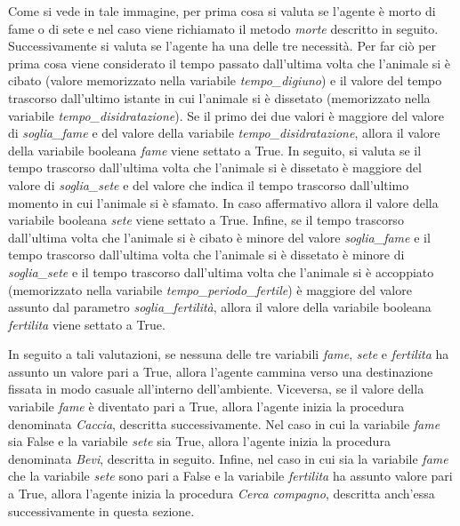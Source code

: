 \documentclass[11pt]{article}
\begin{document}
Come si vede in tale immagine, per prima cosa si valuta se l'agente è morto di fame o di sete e nel caso viene richiamato il metodo \emph{morte} descritto in seguito. Successivamente si valuta se l'agente ha una delle tre necessità. Per far ciò per prima cosa viene considerato il tempo passato dall'ultima volta che l'animale si è cibato (valore memorizzato nella variabile \emph{tempo\_digiuno}) e il valore del tempo trascorso dall'ultimo istante in cui l'animale si è dissetato (memorizzato nella variabile \emph{tempo\_disidratazione}). Se il primo dei due valori è maggiore del valore di \emph{soglia\_fame} e del valore della variabile \emph{tempo\_disidratazione}, allora il valore della variabile booleana \emph{fame} viene settato a True. In seguito, si valuta se il tempo trascorso dall'ultima volta che l'animale si è dissetato è maggiore del valore di \emph{soglia\_sete} e del valore che indica il tempo trascorso dall'ultimo momento in cui l'animale si è sfamato. In caso affermativo allora il valore della variabile booleana \emph{sete} viene settato a True. Infine, se il tempo trascorso dall'ultima volta che l'animale si è cibato è minore del valore \emph{soglia\_fame} e il tempo trascorso dall'ultima volta che l'animale si è dissetato è minore di \emph{soglia\_sete} e il tempo trascorso dall'ultima volta che l'animale si è accoppiato (memorizzato nella variabile \emph{tempo\_periodo\_fertile}) è maggiore del valore assunto dal parametro \emph{soglia\_fertilità}, allora il valore della variabile booleana \emph{fertilita} viene settato a True. 

In seguito a tali valutazioni, se nessuna delle tre variabili \emph{fame}, \emph{sete} e \emph{fertilita} ha assunto un valore pari a True, allora l'agente cammina verso una destinazione fissata in modo casuale all'interno dell'ambiente. Viceversa, se il valore della variabile \emph{fame} è diventato pari a True, allora l'agente inizia la procedura denominata \emph{Caccia}, descritta successivamente. Nel caso in cui la variabile \emph{fame} sia False e la variabile \emph{sete} sia True, allora l'agente inizia la procedura denominata \emph{Bevi}, descritta in seguito. Infine, nel caso in cui sia la variabile \emph{fame} che la variabile \emph{sete} sono pari a False e la variabile \emph{fertilita} ha assunto valore pari a True, allora l'agente inizia la procedura \emph{Cerca compagno}, descritta anch'essa successivamente in questa sezione. 
\end{document}
